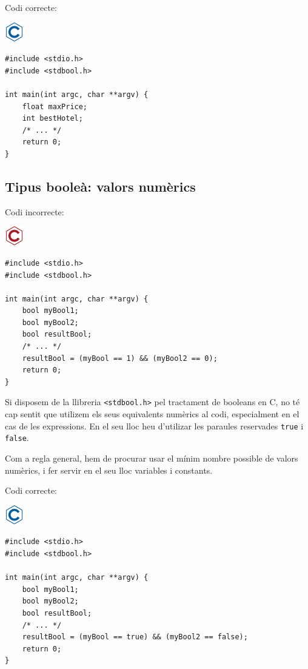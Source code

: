 \documentclass[
]{book}
\begin{document}
Codi correcte:

\includegraphics{./img/c.png}

\begin{verbatim}
#include <stdio.h>
#include <stdbool.h>

int main(int argc, char **argv) {
    float maxPrice;
    int bestHotel;
    /* ... */
    return 0;
}
\end{verbatim}

\hypertarget{tipus-booleuxe0-valors-numuxe8rics}{%
\subsection{Tipus booleà: valors numèrics}\label{tipus-booleuxe0-valors-numuxe8rics}}

Codi incorrecte:

\includegraphics{./img/c_err.png}

\begin{verbatim}
#include <stdio.h>
#include <stdbool.h>

int main(int argc, char **argv) {
    bool myBool1;
    bool myBool2;
    bool resultBool;
    /* ... */
    resultBool = (myBool == 1) && (myBool2 == 0);
    return 0;
}
\end{verbatim}

Si disposem de la llibreria \texttt{\textless{}stdbool.h\textgreater{}} pel tractament de booleans en C, no té cap sentit que utilizem els seus equivalents numèrics al codi, especialment en el cas de les expressions. En el seu lloc heu d'utilizar les paraules reservades \texttt{true} i \texttt{false}.

Com a regla general, hem de procurar usar el mínim nombre possible de valors numèrics, i fer servir en el seu lloc variables i constants.

Codi correcte:

\includegraphics{./img/c.png}

\begin{verbatim}
#include <stdio.h>
#include <stdbool.h>

int main(int argc, char **argv) {
    bool myBool1;
    bool myBool2;
    bool resultBool;
    /* ... */
    resultBool = (myBool == true) && (myBool2 == false);
    return 0;
}
\end{verbatim}
\end{document}
